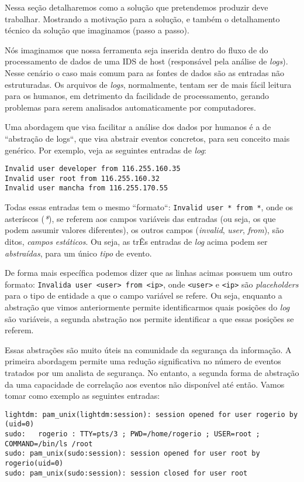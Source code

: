 \documentclass[
	12pt,				%
	openright,			%
	twoside,			%
	a4paper,			%
	english,			%
	spanish,			%
	brazil,				%
	]{abntex2}
\begin{document}
Nessa seção detalharemos como a solução que pretendemos produzir deve trabalhar. Mostrando a motivação para a solução, e também o detalhamento técnico da solução que imaginamos (passo a passo).

Nós imaginamos que nossa ferramenta seja inserida dentro do fluxo de do processamento de dados de uma IDS de host (responsável pela análise de \emph{logs}). Nesse cenário o caso mais comum para as fontes de dados são as entradas não estruturadas. Os arquivos de \emph{logs}, normalmente, tentam ser de mais fácil leitura para os humanos, em detrimento da facilidade de processamento, gerando problemas para serem analisados automaticamente por computadores. 

Uma abordagem que visa facilitar a análise dos dados por humanos é a de ``abstração de logs``, que visa abstrair eventos concretos, para seu conceito mais genérico. Por exemplo, veja as seguintes entradas de \emph{log}:

\begin{verbatim}
Invalid user developer from 116.255.160.35
Invalid user root from 116.255.160.32
Invalid user mancha from 116.255.170.55
\end{verbatim}
	
Todas essas entradas tem o mesmo ``formato``: \verb|Invalid user * from *|, onde os asteríscos (\emph{*}), se referem aos campos variáveis das entradas (ou seja, os que podem assumir valores diferentes), os outros campos (\emph{invalid}, \emph{user}, \emph{from}), são ditos, \emph{campos estáticos}. Ou seja, as trÊs entradas de \emph{log} acima podem ser \emph{abstraídas}, para um único \emph{tipo} de evento. 

De forma mais específica podemos dizer que as linhas acimas possuem um outro formato: \verb|Invalida user <user> from <ip>|, onde \verb|<user>| e \verb|<ip>| são \emph{placeholders} para o tipo de entidade a que o campo variável se refere. Ou seja, enquanto a abstração que vimos anteriormente permite identificarmos quais posições do \emph{log} são variáveis, a segunda abstração nos permite identificar a que essas posições se referem.

Essas abstrações são muito úteis na comunidade da segurança da informação. A primeira abordagem permite uma redução significativa no número de eventos tratados por um analista de segurança. No entanto, a segunda forma de abstração da uma capacidade de correlação aos eventos não disponível até então. Vamos tomar como exemplo as seguintes entradas:

{\small
\begin{verbatim}
lightdm: pam_unix(lightdm:session): session opened for user rogerio by (uid=0)
sudo:   rogerio : TTY=pts/3 ; PWD=/home/rogerio ; USER=root ; COMMAND=/bin/ls /root
sudo: pam_unix(sudo:session): session opened for user root by rogerio(uid=0)
sudo: pam_unix(sudo:session): session closed for user root
\end{verbatim}
}
\end{document}
